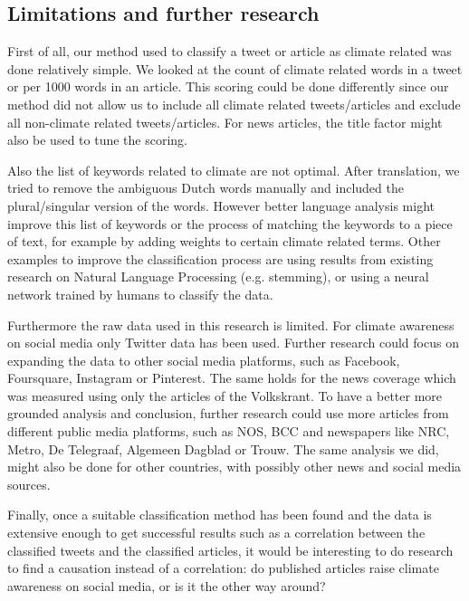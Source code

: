 \documentclass[paper=a4, fontsize=9px]{scrartcl} %
\numberwithin{equation}{section} %
\numberwithin{figure}{section} %
\numberwithin{table}{section} %
\begin{document}
\begin{multicols}{2}
\section{Limitations and further research}\label{sec:limitations}

First of all, our method used to classify a tweet or article as climate related was done relatively simple. We looked at the count of climate related words in a tweet or per 1000 words in an article. This scoring could be done differently since our method did not allow us to include all climate related tweets/articles and exclude all non-climate related tweets/articles. For news articles, the title factor might also be used to tune the scoring.

Also the list of keywords related to climate are not optimal. After translation, we tried to remove the ambiguous Dutch words manually and included the plural/singular version of the words. However better language analysis might improve this list of keywords or the process of matching the keywords to a piece of text, for example by adding weights to certain climate related terms. Other examples to improve the classification process are using results from existing research on Natural Language Processing (e.g. stemming), or using a neural network trained by humans to classify the data. 

Furthermore the raw data used in this research is limited. For climate awareness on social media only Twitter data has been used. Further research could focus on expanding the data to other social media platforms, such as Facebook, Foursquare, Instagram or Pinterest. The same holds for the news coverage which was measured using only the articles of the Volkskrant. To have a better more grounded analysis and conclusion, further research could use more articles from different public media platforms, such as NOS, BCC and newspapers like NRC, Metro, De Telegraaf, Algemeen Dagblad or Trouw. The same analysis we did, might also be done for other countries, with possibly other news and social media sources.

Finally, once a suitable classification method has been found and the data is extensive enough to get successful results such as a correlation between the classified tweets and the classified articles, it would be interesting to do research to find a causation instead of a correlation: do published articles raise climate awareness on social media, or is it the other way around?

\end{multicols}
\end{document}
